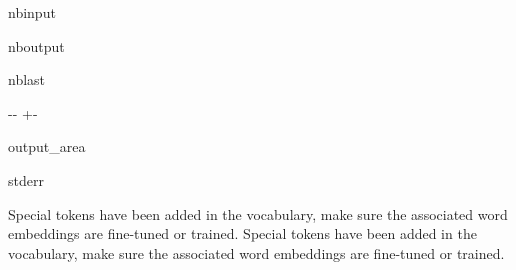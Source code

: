 \documentclass[letterpaper,10pt,english]{sphinxmanual}
\newlength\nbsphinxcodecellspacing
\begin{document}
\begin{sphinxuseclass}{nbinput}
{
\begin{sphinxVerbatim}[commandchars=\\\{\}]
\llap{\color{nbsphinxin}[17]:\,\hspace{\fboxrule}\hspace{\fboxsep}}  
   
   
\end{sphinxVerbatim}
}

\end{sphinxuseclass}
\begin{sphinxuseclass}{nboutput}
\begin{sphinxuseclass}{nblast}
{

\kern-\sphinxverbatimsmallskipamount\kern-\baselineskip
\kern+\FrameHeightAdjust\kern-\fboxrule
\vspace{\nbsphinxcodecellspacing}

\begin{sphinxuseclass}{output_area}
\begin{sphinxuseclass}{stderr}


\begin{sphinxVerbatim}[commandchars=\\\{\}]
Special tokens have been added in the vocabulary, make sure the associated word embeddings are fine-tuned or trained.
Special tokens have been added in the vocabulary, make sure the associated word embeddings are fine-tuned or trained.
\end{sphinxVerbatim}



\end{sphinxuseclass}
\end{sphinxuseclass}
}

\end{sphinxuseclass}
\end{sphinxuseclass}
\end{document}
